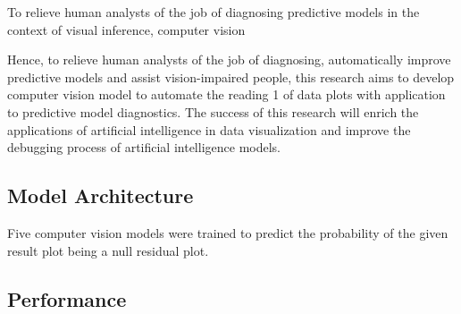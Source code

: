 \documentclass{monashthesis}
\theoremstyle{definition}
\theoremstyle{definition}
\theoremstyle{definition}
\theoremstyle{definition}
\theoremstyle{remark}
\begin{document}
To relieve human analysts of the job of diagnosing predictive models in the context of visual inference, computer vision

Hence, to relieve human analysts of the job of diagnosing, automatically improve predictive models and assist vision-impaired people, this research aims to develop computer vision model to automate the reading
1
of data plots with application to predictive model diagnostics. The success of this research will enrich the applications of artificial intelligence in data visualization and improve the debugging process of artificial intelligence models.

\hypertarget{model-architecture}{%
\subsection{Model Architecture}\label{model-architecture}}

Five computer vision models were trained to predict the probability of the given result plot being a null residual plot.

\hypertarget{performance}{%
\subsection{Performance}\label{performance}}
\end{document}
